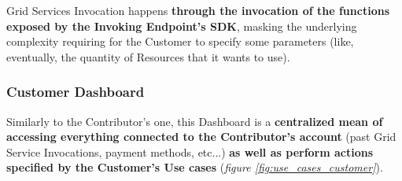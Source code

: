 Grid Services Invocation happens \textbf{through the invocation of the functions exposed by the Invoking Endpoint's SDK}, masking the underlying complexity requiring for the Customer to specify some parameters (like, eventually, the quantity of Resources that it wants to use).

\subsubsection{Customer Dashboard}
Similarly to the Contributor's one, this Dashboard is a \textbf{centralized mean of accessing everything connected to the Contributor's account} (past Grid Service Invocations, payment methods, etc...) \textbf{as well as perform actions specified by the Customer's Use cases} (\textit{figure \ref{fig:use_cases_customer}}).
